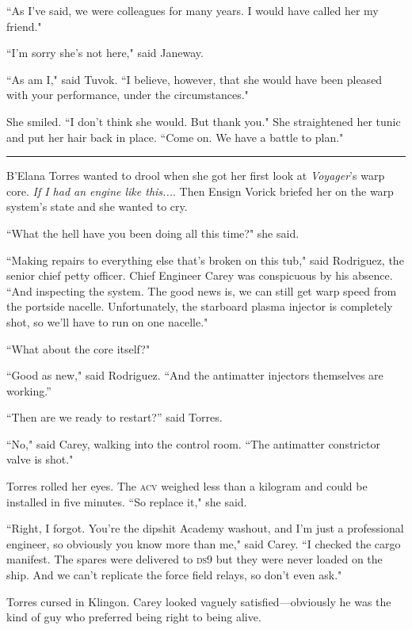 \documentclass[twoside,letterpaper,12pt]{memoir}
\begin{document}
``As I've said, we were colleagues for many years. I would have called her my friend."

``I'm sorry she's not here," said Janeway.

``As am I," said Tuvok. ``I believe, however, that she would have been pleased with your performance, under the circumstances."

She smiled. ``I don't think she would. But thank you." She straightened her tunic and put her hair back in place. ``Come on. We have a battle to plan."

\begin{center}\rule{3cm}{0.4 pt}\end{center}

B'Elana Torres wanted to drool when she got her first look at \textit{Voyager}'s warp core. \textit{If I had an engine like this...}. Then Ensign Vorick briefed her on the warp system's state and she wanted to cry.

``What the hell have you been doing all this time?" she said.

``Making repairs to everything else that's broken on this tub," said Rodriguez, the senior chief petty officer. Chief Engineer Carey was conspicuous by his absence. ``And inspecting the system. The good news is, we can still get warp speed from the portside nacelle. Unfortunately, the starboard plasma injector is completely shot, so we'll have to run on one nacelle."

``What about the core itself?"

``Good as new," said Rodriguez. ``And the antimatter injectors themselves are working.”

“Then are we ready to restart?” said Torres.

``No," said Carey, walking into the control room. ``The antimatter constrictor valve is shot."

Torres rolled her eyes. The \textsc{acv} weighed less than a kilogram and could be installed in five minutes. ``So replace it," she said.

``Right, I forgot. You're the dipshit Academy washout, and I'm just a professional engineer, so obviously you know more than me," said Carey. ``I checked the cargo manifest. The spares were delivered to \textsc{ds9} but they were never loaded on the ship. And we can't replicate the force field relays, so don't even ask."

Torres cursed in Klingon. Carey looked vaguely satisfied---obviously he was the kind of guy who preferred being right to being alive.
\end{document}
